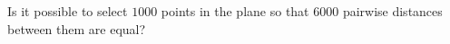 Is it possible to select $1000$ points in the plane so that $6000$ pairwise distances between them are equal?
